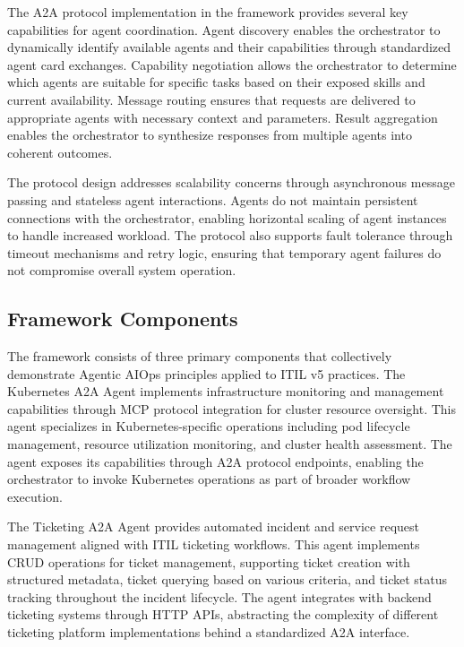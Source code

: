 \documentclass{article}
\begin{document}
The A2A protocol implementation in the framework provides several key capabilities for agent coordination. Agent discovery enables the orchestrator to dynamically identify available agents and their capabilities through standardized agent card exchanges. Capability negotiation allows the orchestrator to determine which agents are suitable for specific tasks based on their exposed skills and current availability. Message routing ensures that requests are delivered to appropriate agents with necessary context and parameters. Result aggregation enables the orchestrator to synthesize responses from multiple agents into coherent outcomes.

The protocol design addresses scalability concerns through asynchronous message passing and stateless agent interactions. Agents do not maintain persistent connections with the orchestrator, enabling horizontal scaling of agent instances to handle increased workload. The protocol also supports fault tolerance through timeout mechanisms and retry logic, ensuring that temporary agent failures do not compromise overall system operation.

\subsection{Framework Components}

The framework consists of three primary components that collectively demonstrate Agentic AIOps principles applied to ITIL v5 practices. The Kubernetes A2A Agent implements infrastructure monitoring and management capabilities through MCP protocol integration for cluster resource oversight. This agent specializes in Kubernetes-specific operations including pod lifecycle management, resource utilization monitoring, and cluster health assessment. The agent exposes its capabilities through A2A protocol endpoints, enabling the orchestrator to invoke Kubernetes operations as part of broader workflow execution.

The Ticketing A2A Agent provides automated incident and service request management aligned with ITIL ticketing workflows. This agent implements CRUD operations for ticket management, supporting ticket creation with structured metadata, ticket querying based on various criteria, and ticket status tracking throughout the incident lifecycle. The agent integrates with backend ticketing systems through HTTP APIs, abstracting the complexity of different ticketing platform implementations behind a standardized A2A interface.
\end{document}
